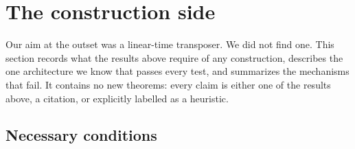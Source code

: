 \section{The construction side}\label{sec:construction}

Our aim at the outset was a linear-time transposer. We did not find one. This section records what the
results above require of any construction, describes the one architecture we know that passes every
test, and summarizes the mechanisms that fail. It contains no new theorems: every claim is either one of
the results above, a citation, or explicitly labelled as a heuristic.

\subsection{Necessary conditions}

